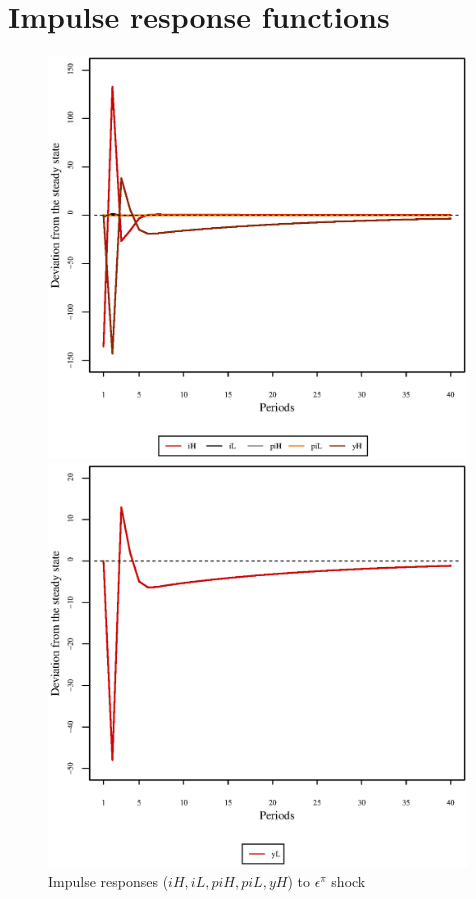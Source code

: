 \pagebreak

\section{Impulse response functions}

\begin{figure}[h]
\begin{minipage}{0.5\textwidth}
\vspace*{-3em}
\centering
\includegraphics[width=0.99\textwidth, scale=0.55]{plots/plot_47.eps}
\caption{Impulse responses (${i\!H}, {i\!L}, {p\!i\!H}, {p\!i\!L}, {y\!H}$) to $\epsilon^{\pi}$ shock}
\end{minipage}
\begin{minipage}{0.5\textwidth}
\vspace*{-3em}
\centering
\includegraphics[width=0.99\textwidth, scale=0.55]{plots/plot_48.eps}

\end{minipage}
\end{figure}
